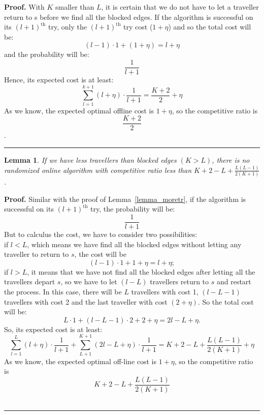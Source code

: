 \documentclass[a4paper, 10pt]{article}
\newtheorem{lemma}{Lemma}
\newenvironment{proof}[1][Proof]{\textbf{#1.} }{\ \rule{0.5em}{0.5em}}
\begin{document}
\begin{proof} 
With $K$ smaller than $L$, it is certain that we do not have to let a traveller return to s before we find all the blocked edges. If the algorithm is successful on its $(l+1)^{\text{th}}$ try, only the $(l+1)^{\text{th}}$ try cost ($1+ \eta$) and so the total cost will be:
\begin{equation}
(l-1)\cdot 1 + (1+\eta) = l+\eta
\end{equation}
and the probability will be: 
\begin{equation}
\frac{1}{l+1}
\end{equation}
Hence, its expected cost is at least:
\begin{equation}
\sum_{l=1}^{k+1}(l+\eta)\cdot \frac{1}{l+1} = \frac{K+2}{2}+\eta
\end{equation}
As we know, the expected optimal offline cost is $1 + \eta$, so the competitive ratio is 
\begin{equation}
\frac{K+2}{2} 
\end{equation}.
\end{proof}

\begin{lemma}
If we have less travellers than blocked edges $ (K > L )$, there is no randomized online algorithm with competitive ratio less than $
K+2-L+ \frac{L(L-1)}{2(K+1)}$.
\end{lemma}

\begin{proof}
Similar with the proof of Lemma~\ref{lemma_moretr}, if the algorithm is successful on its $(l+1)^{\text{th}}$ try, the probability will be: 
\begin{equation}
\frac{1}{l+1}
\end{equation}
But to calculus the cost, we have to consider two possibilities: 
\\if $l < L$, which means we have find all the blocked edges without letting any traveller to return to $s$, the cost will be 
\begin{equation}
(l-1)\cdot1 + 1 +\eta = l + \eta;
\end{equation}
if $l > L$, it means that we have not find all the blocked edges after letting all the travellers depart $s$,  so we have to let $(l-L)$ travellers return to $s$ and restart the process. In this case, there will be $L$ travellers with cost 1, $(l-L-1)$ travellers with cost 2 and the last traveller with cost $(2+\eta)$. So the total cost will be:
\begin{equation}
L\cdot 1 + (l-L-1)\cdot2 + 2 +\eta = 2l - L + \eta .
\end{equation}
So, its expected cost is at least:
\begin{equation}
\sum_{l=1}^{L}(l+\eta)\cdot \frac{1}{l+1}  +  \sum_{L+1}^{K+1}(2l-L+\eta)\cdot \frac{1}{l+1}
 =K+2-L+ \frac{L(L-1)}{2(K+1)} + \eta
\end{equation}
As we know, the expected optimal off-line cost is $1 + \eta$, so the competitive ratio is 
\begin{equation}
K+2-L+ \frac{L(L-1)}{2(K+1)}
\end{equation}
\end{proof}
\end{document}
